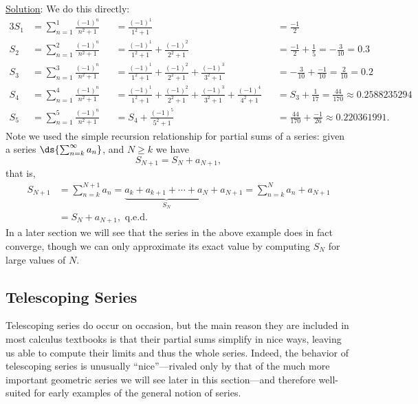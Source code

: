 \underline{Solution}: We do this directly:
\begin{alignat*}{3}
S_1&=\sum_{n=1}^1\frac{(-1)^n}{n^2+1}
  &&=\frac{(-1)^1}{1^2+1}&&=\frac{-1}2\\
S_2&=\sum_{n=1}^2\frac{(-1)^n}{n^2+1}
  &&=\frac{(-1)^1}{1^2+1}+\frac{(-1)^2}{2^2+1}
  &&=\frac{-1}2+\frac1{5}=-\frac{3}{10}=0.3\\
S_3&=\sum_{n=1}^3\frac{(-1)^n}{n^2+1}
  &&=\frac{(-1)^1}{1^2+1}+\frac{(-1)^2}{2^2+1}+\frac{(-1)^3}{3^2+1}
    &&=-\frac{3}{10}+\frac{-1}{10}=\frac2{10}=0.2\\
S_4&=\sum_{n=1}^4\frac{(-1)^n}{n^2+1}
  &&=\frac{(-1)^1}{1^2+1}+\frac{(-1)^2}{2^2+1}+\frac{(-1)^3}{3^2+1}
         +\frac{(-1)^4}{4^2+1}
  &&=S_3+\frac{1}{17}=\frac{44}{170}\approx0.2588235294\\
S_5&=\sum_{n=1}^5\frac{(-1)^n}{n^2+1}&&
    =S_4+\frac{(-1)^5}{5^2+1}
   &&=\frac{44}{170}+\frac{-1}{26}\approx0.220361991.
\end{alignat*}
\eex
Note we used the simple recursion relationship for partial sums
of a series: given a series
$\ds{\sum_{n=k}^\infty a_n}$, and $N\ge k$ we have
\begin{equation}
S_{N+1}=S_N+a_{N+1},\label{RecursionSn+1=Sn+An+1}
\end{equation}
that is,
\begin{align*}
S_{N+1}&=\sum_{n=k}^{N+1}a_n=\underbrace{a_k+a_{k+1}+\cdots+a_N}_{S_N}
                +a_{N+1}=\sum_{n=k}^Na_n+a_{N+1}\\
       &=S_N+a_{N+1},\text{ q.e.d.}\end{align*}
In a later section 
we will see that the series in the above example does in fact
converge, though we can only approximate its exact value
by computing $S_N$ for large values of $N$.

\subsection{Telescoping Series}
Telescoping series do occur on occasion, but the main reason
they are included in most calculus textbooks is that their
partial sums simplify in nice ways, leaving us able to compute
their limits and thus the whole series.  Indeed, the behavior
of telescoping series is unusually ``nice''---rivaled only by
that of the much more important
geometric series we will see later in this section---and therefore
well-suited for early examples of the general notion of series.


